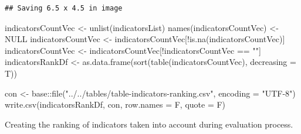 \documentclass[
]{article}
\newenvironment{Shaded}{\begin{snugshade}}{\end{snugshade}}
\newcommand{\AttributeTok}[1]{\textcolor[rgb]{0.77,0.63,0.00}{#1}}
\newcommand{\ConstantTok}[1]{\textcolor[rgb]{0.00,0.00,0.00}{#1}}
\newcommand{\FunctionTok}[1]{\textcolor[rgb]{0.00,0.00,0.00}{#1}}
\newcommand{\NormalTok}[1]{#1}
\newcommand{\OtherTok}[1]{\textcolor[rgb]{0.56,0.35,0.01}{#1}}
\newcommand{\SpecialCharTok}[1]{\textcolor[rgb]{0.00,0.00,0.00}{#1}}
\newcommand{\StringTok}[1]{\textcolor[rgb]{0.31,0.60,0.02}{#1}}
\begin{document}
\begin{verbatim}
## Saving 6.5 x 4.5 in image
\end{verbatim}

\begin{Shaded}
\begin{Highlighting}[]
\NormalTok{indicatorsCountVec }\OtherTok{\textless{}{-}} \FunctionTok{unlist}\NormalTok{(indicatorsList)}
\FunctionTok{names}\NormalTok{(indicatorsCountVec) }\OtherTok{\textless{}{-}} \ConstantTok{NULL}
\NormalTok{indicatorsCountVec }\OtherTok{\textless{}{-}}\NormalTok{ indicatorsCountVec[}\SpecialCharTok{!}\FunctionTok{is.na}\NormalTok{(indicatorsCountVec)]}
\NormalTok{indicatorsCountVec }\OtherTok{\textless{}{-}}\NormalTok{ indicatorsCountVec[}\SpecialCharTok{!}\NormalTok{indicatorsCountVec }\SpecialCharTok{==} \StringTok{""}\NormalTok{]}
\NormalTok{indicatorsRankDf }\OtherTok{\textless{}{-}} \FunctionTok{as.data.frame}\NormalTok{(}\FunctionTok{sort}\NormalTok{(}\FunctionTok{table}\NormalTok{(indicatorsCountVec), }\AttributeTok{decreasing =}\NormalTok{ T))}

\NormalTok{con }\OtherTok{\textless{}{-}}\NormalTok{ base}\SpecialCharTok{::}\FunctionTok{file}\NormalTok{(}\StringTok{"../../tables/table{-}indicators{-}ranking.csv"}\NormalTok{, }\AttributeTok{encoding =} \StringTok{"UTF{-}8"}\NormalTok{)}
\FunctionTok{write.csv}\NormalTok{(indicatorsRankDf, con, }\AttributeTok{row.names =}\NormalTok{ F, }\AttributeTok{quote =}\NormalTok{ F)}
\end{Highlighting}
\end{Shaded}

Creating the ranking of indicators taken into account during evaluation process.

\begin{Shaded}
\end{Shaded}
\end{document}
